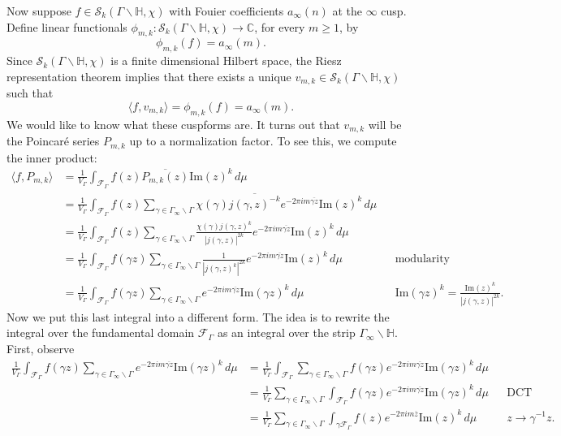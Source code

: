 \documentclass[12pt]{book}
\theoremstyle{definition}\newframedtheorem{method}{Method}
\newcommand{\mc}{\mathcal}
\newcommand{\C}{\mathbb{C}}
\renewcommand{\H}{\mathbb{H}}
\newcommand{\g}{\gamma}
\newcommand{\G}{\Gamma}
\newcommand{\<}{\langle}
\renewcommand{\>}{\rangle}
\newcommand{\conj}{\overline}
\renewcommand{\Im}{\mathrm{Im}}
\newcommand{\GH}{\G\backslash\H}
\newcommand{\GG}{\G_{\infty}\backslash\G}
\begin{document}
      Now suppose $f \in \mc{S}_{k}(\GH,\chi)$ with Fouier coefficients $a_{\infty}(n)$ at the $\infty$ cusp. Define linear functionals $\phi_{m,k}:\mc{S}_{k}(\GH,\chi) \to \C$, for every $m \ge 1$, by
      \[
        \phi_{m,k}(f) = a_{\infty}(m).
      \]
      Since $\mc{S}_{k}(\GH,\chi)$ is a finite dimensional Hilbert space, the Riesz representation theorem implies that there exists a unique $v_{m,k} \in \mc{S}_{k}(\GH,\chi)$ such that
      \[
        \<f,v_{m,k}\> = \phi_{m,k}(f) = a_{\infty}(m).
      \]
      We would like to know what these cuspforms are. It turns out that $v_{m,k}$ will be the Poincar\'e series $P_{m,k}$ up to a normalization factor. To see this, we compute the inner product:
      \begin{align*}
        \<f,P_{m,k}\> &= \frac{1}{V_{\G}}\int_{\mc{F}_{\G}}f(z)\conj{P_{m,k}(z)}\Im(z)^{k}\,d\mu \\
        &= \frac{1}{V_{\G}}\int_{\mc{F}_{\G}}f(z)\sum_{\g \in \GG}\chi(\g)\conj{j(\g,z)^{-k}}e^{-2\pi im\conj{\g z}}\Im(z)^{k}\,d\mu \\
        &= \frac{1}{V_{\G}}\int_{\mc{F}_{\G}}f(z)\sum_{\g \in \GG}\frac{\chi(\g)j(\g,z)^{k}}{|j(\g,z)|^{2k}}e^{-2\pi im\conj{\g z}}\Im(z)^{k}\,d\mu \\
        &= \frac{1}{V_{\G}}\int_{\mc{F}_{\G}}f(\g z)\sum_{\g \in \GG}\frac{1}{|j(\g,z)^{k}|^{2k}}e^{-2\pi im\conj{\g z}}\Im(z)^{k}\,d\mu && \text{modularity} \\
        &= \frac{1}{V_{\G}}\int_{\mc{F}_{\G}}f(\g z)\sum_{\g \in \GG}e^{-2\pi im\conj{\g z}}\Im(\g z)^{k}\,d\mu && \text{$\Im(\g z)^{k} = \frac{\Im(z)^{k}}{|j(\g,z)|^{2k}}$.}
      \end{align*}
      Now we put this last integral into a different form. The idea is to rewrite the integral over the fundamental domain $\mc{F}_{\G}$ as an integral over the strip $\G_{\infty}\backslash\H$. First, observe
      \begin{align*}
        \frac{1}{V_{\G}}\int_{\mc{F}_{\G}}f(\g z)\sum_{\g \in \GG}e^{-2\pi im\conj{\g z}}\Im(\g z)^{k}\,d\mu &= \frac{1}{V_{\G}}\int_{\mc{F}_{\G}}\sum_{\g \in \GG}f(\g z)e^{-2\pi im\conj{\g z}}\Im(\g z)^{k}\,d\mu \\
        &= \frac{1}{V_{\G}}\sum_{\g \in \GG}\int_{\mc{F}_{\G}}f(\g z)e^{-2\pi im\conj{\g z}}\Im(\g z)^{k}\,d\mu && \text{DCT} \\
        &= \frac{1}{V_{\G}}\sum_{\g \in \GG}\int_{\g\mc{F}_{\G}}f(z)e^{-2\pi im\conj{z}}\Im(z)^{k}\,d\mu && \text{$z \to \g^{-1}z$.}
      \end{align*}
\end{document}
